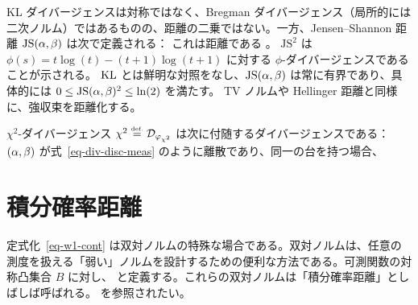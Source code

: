 \begin{example}
	KL ダイバージェンスは対称ではなく、Bregman ダイバージェンス（局所的には二次ノルム）ではあるものの、距離の二乗ではない。一方、Jensen--Shannon 距離 $\text{JS}(\alpha,\beta)$ は次で定義される：
	これは距離である \citep{endres2003new,osterreicher2003new}。
	$\text{JS}^2$ は $\phi(s) = t\log(t)-(t+1)\log(t+1)$ に対する $\phi$-ダイバージェンスであることが示される。
	$\operatorname{KL}$ とは鮮明な対照をなし、$\text{JS}(\alpha,\beta)$ は常に有界であり、具体的には $0 \leq \text{JS}(\alpha,\beta)^2 \leq \ln(2)$ を満たす。
	TV ノルムや Hellinger 距離と同様に、強収束を距離化する。
\end{example}



\begin{example}[$\chi^2$]\label{exmp-chisquare}
	$\chi^2$-ダイバージェンス $\chi^2 \stackrel{\mbox{\upshape\tiny def.}}{=} \mathcal{D}_{\varphi_{\chi^2}}$ は次に付随するダイバージェンスである：
	$(\alpha,\beta)$ が式~\eqref{eq-div-disc-meas} のように離散であり、同一の台を持つ場合、
\end{example}


\section{積分確率距離}
\label{sec-dual-norms}


定式化~\eqref{eq-w1-cont} は双対ノルムの特殊な場合である。双対ノルムは、任意の測度を扱える「弱い」ノルムを設計するための便利な方法である。可測関数の対称凸集合 $B$ に対し、
と定義する。これらの双対ノルムは「積分確率距離」としばしば呼ばれる。\citep{sriperumbudur2012empirical} を参照されたい。



